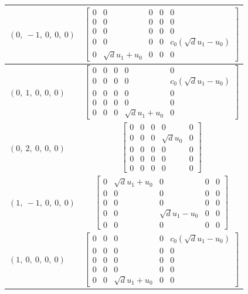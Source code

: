 \documentclass[11pt]{article}
\theoremstyle{definition}
\begin{document}
\begin{longtable}{|l|c|}
    \hline
    $\left( 0, \  -1, \  0, \  0, \  0\right)$ & ${\left[\begin{matrix}0 & 0 & 0 & 0 & 0\\0 & 0 & 0 & 0 & 0\\0 & 0 & 0 & 0 & 0\\0 & 0 & 0 & 0 & c_{0} \left(\sqrt{d} u_{1} - u_{0}\right)\\0 & \sqrt{d} u_{1} + u_{0} & 0 & 0 & 0\end{matrix}\right]}$ \\
    \hline
    $\left( 0, \  1, \  0, \  0, \  0\right)$ & ${\left[\begin{matrix}0 & 0 & 0 & 0 & 0\\0 & 0 & 0 & 0 & c_{0} \left(\sqrt{d} u_{1} - u_{0}\right)\\0 & 0 & 0 & 0 & 0\\0 & 0 & 0 & 0 & 0\\0 & 0 & 0 & \sqrt{d} u_{1} + u_{0} & 0\end{matrix}\right]}$ \\
    \hline
    $\left( 0, \  2, \  0, \  0, \  0\right)$ & ${\left[\begin{matrix}0 & 0 & 0 & 0 & 0\\0 & 0 & 0 & \sqrt{d} u_{0} & 0\\0 & 0 & 0 & 0 & 0\\0 & 0 & 0 & 0 & 0\\0 & 0 & 0 & 0 & 0\end{matrix}\right]}$ \\
    \hline
    $\left( 1, \  -1, \  0, \  0, \  0\right)$ & ${\left[\begin{matrix}0 & \sqrt{d} u_{1} + u_{0} & 0 & 0 & 0\\0 & 0 & 0 & 0 & 0\\0 & 0 & 0 & 0 & 0\\0 & 0 & \sqrt{d} u_{1} - u_{0} & 0 & 0\\0 & 0 & 0 & 0 & 0\end{matrix}\right]}$ \\
    \hline
    $\left( 1, \  0, \  0, \  0, \  0\right)$ & ${\left[\begin{matrix}0 & 0 & 0 & 0 & c_{0} \left(\sqrt{d} u_{1} - u_{0}\right)\\0 & 0 & 0 & 0 & 0\\0 & 0 & 0 & 0 & 0\\0 & 0 & 0 & 0 & 0\\0 & 0 & \sqrt{d} u_{1} + u_{0} & 0 & 0\end{matrix}\right]}$ \\

\end{longtable}
\end{document}
